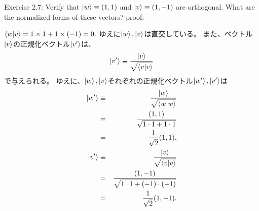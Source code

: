 \begin{flushleft}
\setcounter{equation}{0}
{\Large Exercise 2.7:}
Verify that $\ket{w} \equiv (1, 1)$ and $\ket{v} \equiv (1, -1)$ are orthogonal.
What are the normalized forms of these vectors?
\newline
\vspace{0.2in}
{\large proof:}

$\braket{w|v} = 1 \times 1 + 1 \times (-1) = 0.$
\newline
ゆえに$\ket{w}, \ket{v}$は直交している。
また、ベクトル$\ket{v}$の正規化ベクトル$\ket{v'}$は、
\begin{equation}
\ket{v'} \equiv \frac{\ket{v}}{\sqrt{\braket{v|v}}}
\end{equation}
で与えられる。
\newline
ゆえに、$\ket{w}, \ket{v}$それぞれの正規化ベクトル$\ket{w'}, \ket{v'}$は
\begin{eqnarray*}
\ket{w'} &\equiv& \frac{\ket{w}}{\sqrt{\braket{w|w}}}\\
&=& \frac{(1, 1)}{\sqrt{1 \cdot 1 + 1 \cdot 1}}\\
&=&  \frac{1}{\sqrt{2}}(1, 1),\\
\ket{v'} &\equiv& \frac{\ket{v}}{\sqrt{\braket{v|v}}}\\
&=& \frac{(1, -1)}{\sqrt{1 \cdot 1 + (-1) \cdot (-1)}}\\
&=&  \frac{1}{\sqrt{2}}(1, -1).
\end{eqnarray*}
\end{flushleft}
